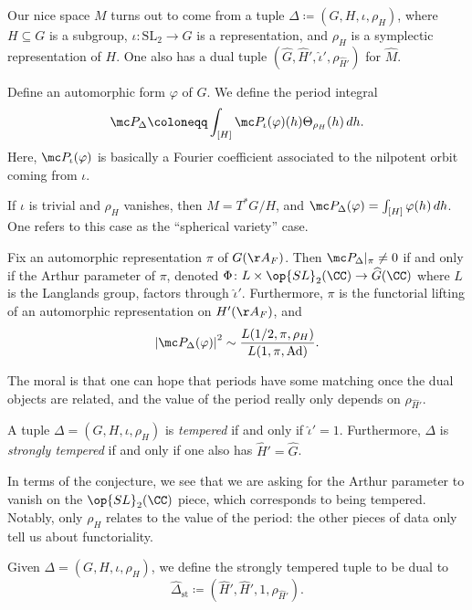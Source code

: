 \documentclass{article}
\begin{document}
Our nice space $M$ turns out to come from a tuple $\Delta\coloneqq(G,H,\iota,\rho_H)$, where $H\subseteq G$ is a subgroup, $\iota\colon\mathrm{SL}_2\to G$ is a representation, and $\rho_H$ is a symplectic representation of $H$. One also has a dual tuple $(\widehat G,\widehat H',\widehat\iota',\rho_{\widehat H'})$ for $\widehat M$.
\begin{notation}
	Define an automorphic form $\varphi$ of $G$. We define the period integral
	\[\mc P_\Delta\coloneqq\int_{[H]}\mc P_\iota(\varphi)(h)\Theta_{\rho_H}(h)\,dh.\]
	Here, $\mc P_\iota(\varphi)$ is basically a Fourier coefficient associated to the nilpotent orbit coming from $\iota$.
\end{notation}
\begin{example}
	If $\iota$ is trivial and $\rho_H$ vanishes, then $M=T^*G/H$, and $\mc P_\Delta(\varphi)=\int_{[H]}\varphi(h)\,dh$. One refers to this case as the ``spherical variety'' case.
\end{example}
\begin{conj}
	Fix an automorphic representation $\pi$ of $G(\AA_F)$. Then $\mc P_\Delta|_\pi\ne0$ if and only if the Arthur parameter of $\pi$, denoted $\Phi\colon L\times\op{SL}_2(\CC)\to\widehat G(\CC)$ where $L$ is the Langlands group, factors through $\widehat\iota'$. Furthermore, $\pi$ is the functorial lifting of an automorphic representation on $H'(\AA_F)$, and
	\[\left|\mc P_\Delta(\varphi)\right|^2\sim\frac{L(1/2,\pi,\rho_H)}{L(1,\pi,\mathrm{Ad})}.\]
\end{conj}
The moral is that one can hope that periods have some matching once the dual objects are related, and the value of the period really only depends on $\rho_{\widehat H'}$.
\begin{definition}
	A tuple $\Delta=(G,H,\iota,\rho_H)$ is \textit{tempered} if and only if $\widehat\iota'=1$. Furthermore, $\Delta$ is \textit{strongly tempered} if and only if one also has $\widehat H'=\widehat G$.
\end{definition}
In terms of the conjecture, we see that we are asking for the Arthur parameter to vanish on the $\op{SL}_2(\CC)$ piece, which corresponds to being tempered. Notably, only $\rho_H$ relates to the value of the period: the other pieces of data only tell us about functoriality.
\begin{notation}
	Given $\Delta=(G,H,\iota,\rho_H)$, we define the strongly tempered tuple to be dual to
	\[\widehat\Delta_{\mathrm{st}}\coloneqq\left(\widehat H',\widehat H',1,\rho_{\widehat H'}\right).\]
\end{notation}
\end{document}
